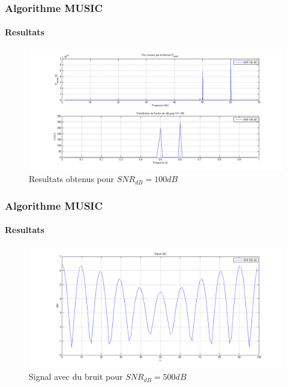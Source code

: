 \documentclass[10pt]{beamer}
\begin{document}
\begin{frame}
%
\frametitle{Algorithme MUSIC}
\framesubtitle{Resultats}

\begin{figure}[h]
\includegraphics[scale=0.28 ]{images/snr100}
\caption{Resultats obtenus pour \(SNR_{dB} = 100 dB\)}
\label{fig:snr100}
\end{figure}

\end{frame}


\begin{frame}
%
\frametitle{Algorithme MUSIC}
\framesubtitle{Resultats}

\begin{figure}[h]
\centering
\includegraphics[scale= 0.28 ]{images/wave500}
\caption{Signal avec du bruit pour \(SNR_{dB} = 500 dB\)}
\label{fig:snr0001}
\end{figure}

\end{frame}

\end{document}
